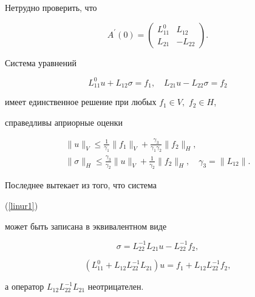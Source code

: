 \begin{pf}


Нетрудно проверить, что 


$$


A^\prime (0) =


\begin{pmatrix}


L_{11}^0 &L_{12} \\


L_{21} & -L_{22}


\end{pmatrix}.


$$ 


Система уравнений 


\begin{equation}


\label{linur1}


L^{0}_{11}u + L_{12} \sigma = f_1, \quad


L_{21}u - L_{22} \sigma = f_2


\end{equation}


имеет единственное решение при любых $ f_1 \in V,$ $ f_2 \in H $,


справедливы априорные оценки


\begin{gather*}


\|u\|_{V} 


\le \frac{1}{\gamma _1 } \|f_1 \|_V 


+\frac{\gamma _3}{\gamma _1 \gamma _2} \|f_2 \|_H, \\


\|\sigma \|_{H}\le 


\frac{\gamma _3}{\gamma _2} \| u \|_{V}


 + \frac{1}{\gamma _2} \| f_2 \|_H, \quad 


 \gamma _3 = \|L_{12} \|.


\end{gather*}


Последнее вытекает из того, что система


(\ref{linur1}) 


может быть записана в эквивалентном виде


$$


\sigma = L^{-1}_{22} L_{21}u - L^{-1}_{22} f_2,


$$


$$


(L^0_{11} + L_{12}L^{-1}_{22}L_{21})u = f_1 + L_{12} L^{-1}_{22} f_2,


$$


а оператор $L_{12}L^{-1}_{22}L_{21}$ неотрицателен.


\end{pf}






